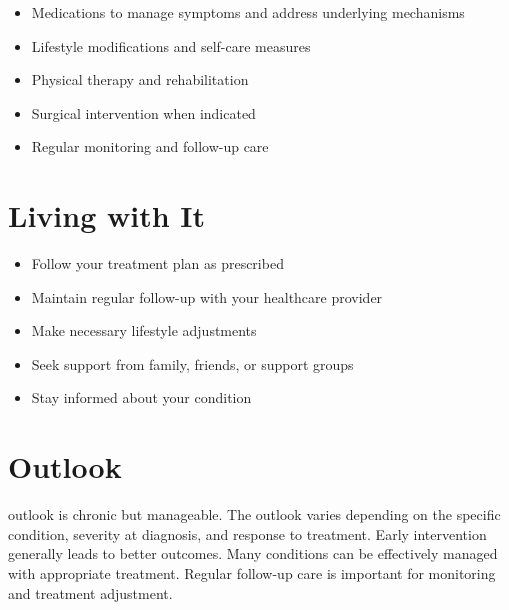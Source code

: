 \begin{itemize}[noitemsep]
  \item Medications to manage symptoms and address underlying mechanisms
  \item Lifestyle modifications and self-care measures
  \item Physical therapy and rehabilitation
  \item Surgical intervention when indicated
  \item Regular monitoring and follow-up care
\end{itemize}
\section{Living with It}
\begin{itemize}[noitemsep]
  \item Follow your treatment plan as prescribed
  \item Maintain regular follow-up with your healthcare provider
  \item Make necessary lifestyle adjustments
  \item Seek support from family, friends, or support groups
  \item Stay informed about your condition
\end{itemize}
\section{Outlook}
outlook is chronic but manageable. The outlook varies depending on the specific condition, severity at diagnosis, and response to treatment. Early intervention generally leads to better outcomes. Many conditions can be effectively managed with appropriate treatment. Regular follow-up care is important for monitoring and treatment adjustment.
